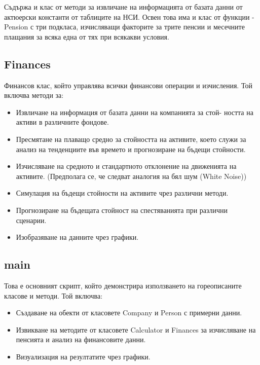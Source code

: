 \documentclass[a4paper,12pt]{article}
\begin{document}
Съдържа и клас от методи за извличане на информацията от базата данни от актюерски константи от таблиците на НСИ. Освен това има и клас от функции - Pension с три подкласа, изчисляващи факторите за трите пенсии и месечните плащания за всяка една от тях при всякакви условия.
\subsection{Finances}
Финансов клас, който управлява всички финансови операции и изчисления. Той включва методи за:
\begin{itemize}
        \item Извличане на информация от базата данни на компанията за стой- ността на активи в различните фондове.
        \item Пресмятане на плаващо средно за стойността на активите, което служи за анализ на тенденциите във времето и прогнозиране на бъдещи стойности.
        \item Изчисляване на средното и стандартното отклонение на движенията на активите. (Предполага се, че следват аналогия на бял шум (White Noise))
        \item Симулация на бъдещи стойности на активите чрез различни методи.
        \item Прогнозиране на бъдещата стойност на спестяванията при различни сценарии.
        \item Изобразяване на данните чрез графики.
\end{itemize}
\subsection{main}
Това е основният скрипт, който демонстрира използването на гореописаните класове и методи. Той включва:
\begin{itemize}
        \item Създаване на обекти от класовете Company и Person с примерни данни.
        \item Извикване на методите от класовете Calculator и Finances за изчисляване на пенсията и анализ на финансовите данни.
        \item Визуализация на резултатите чрез графики.
\end{itemize}
\newpage
\end{document}
